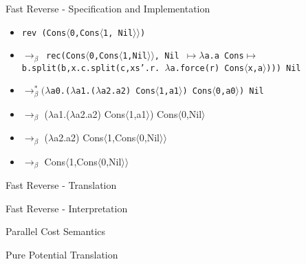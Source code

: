 \documentclass[pdf]{beamer}
\newcommand{\T}[1]{\texttt{#1}}
\newcommand{\LP}{\langle}
\newcommand{\RP}{\rangle}
\begin{document}
\begin{frame}{Fast Reverse - Specification and Implementation}
  \begin{itemize}
    \item
      \T{rev (Cons$\LP$0,Cons$\LP$1, Nil$\RP\RP$)}
    \item
    \T{$\to_\beta$
      rec(Cons$\LP$0,Cons$\LP$1,Nil$\RP\RP$,
          Nil $\mapsto\lambda$a.a
          Cons$\mapsto$b.split(b,x.c.split(c,xs'.r.
      $\lambda$a.force(r) Cons$\LP$x,a$\RP$))) Nil}
    \item
      \T{$\to^*_\beta (\lambda$a0.($\lambda$a1.($\lambda$a2.a2) Cons$\LP$1,a1$\RP$) Cons$\LP$0,a0$\RP$) Nil}
    \item
      $\to_\beta$ ($\lambda$a1.($\lambda$a2.a2) Cons$\LP$1,a1$\RP$) Cons$\LP$0,Nil$\RP$
    \item
      $\to_\beta$ ($\lambda$a2.a2) Cons$\LP$1,Cons$\LP$0,Nil$\RP\RP$
    \item
      $\to_\beta$ Cons$\LP$1,Cons$\LP$0,Nil$\RP\RP$
  \end{itemize}
\end{frame}

\begin{frame}{Fast Reverse - Translation}
\end{frame}

\begin{frame}{Fast Reverse - Interpretation}
\end{frame}

\begin{frame}{Parallel Cost Semantics}
\end{frame}

\begin{frame}{Pure Potential Translation}
\end{frame}
\end{document}
